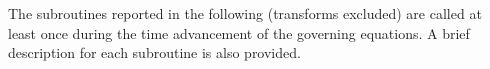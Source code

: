 
The subroutines reported in the following (transforms excluded) are called at least once during the time advancement of the governing equations.
A brief description for each subroutine is also provided.

